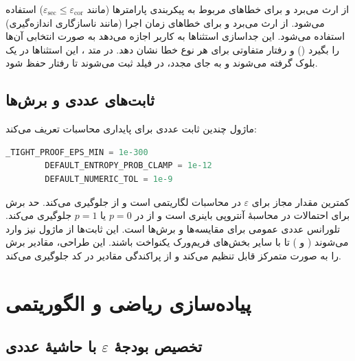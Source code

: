  از  ارث می‌برد و برای خطاهای مربوط به پیکربندی پارامترها (مانند $\varepsilon_{\text{sec}} \le \varepsilon_{\text{cor}}$) استفاده می‌شود.  از  ارث می‌برد و برای خطاهای زمان اجرا (مانند ناسازگاری اندازه‌گیری) استفاده می‌شود. این جداسازی استثناها به کاربر اجازه می‌دهد به صورت انتخابی آن‌ها را بگیرد () و رفتار متفاوتی برای هر نوع خطا نشان دهد. در متد ، این استثناها در یک بلوک  گرفته می‌شوند و به جای  مجدد، در فیلد  ثبت می‌شوند تا رفتار  حفظ شود.

\subsection{ثابت‌های عددی و برش‌ها}

ماژول چندین ثابت عددی برای پایداری محاسبات تعریف می‌کند:

\begin{LTR}
	\begin{lstlisting}[language=Python]
		_TIGHT_PROOF_EPS_MIN = 1e-300
		DEFAULT_ENTROPY_PROB_CLAMP = 1e-12
		DEFAULT_NUMERIC_TOL = 1e-9
	\end{lstlisting}
\end{LTR}

 کمترین مقدار مجاز برای $\varepsilon$ در محاسبات لگاریتمی است و از  جلوگیری می‌کند.  حد برش برای احتمالات در محاسبۀ آنتروپی باینری است و از  در $p = 0$ یا $p = 1$ جلوگیری می‌کند.  تلورانس عددی عمومی برای مقایسه‌ها و برش‌ها است. این ثابت‌ها از ماژول  نیز وارد می‌شوند ( و ) تا با سایر بخش‌های فریم‌ورک یکنواخت باشند. این طراحی، مقادیر برش را به صورت متمرکز قابل تنظیم می‌کند و از پراکندگی مقادیر در کد جلوگیری می‌کند.

\section{پیاده‌سازی ریاضی و الگوریتمی}

\subsection{تخصیص بودجۀ $\varepsilon$ با حاشیۀ عددی}

